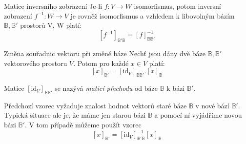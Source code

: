 \begin{vetaN}{Matice inversního zobrazení}
Je-li $f: V \rightarrow W$ isomorfismus, potom inversní zobrazení $f^{-1}: W \rightarrow V$ je rovněž isomorfismus a vzhledem k libovolným bázím $\mathbb{B}, \mathbb{B}'$ prostorů V, W platí:
$$[f^{-1}]_{\mathbb{B}' \mathbb{B}} = [f]^{-1}_{\mathbb{B} \mathbb{B}'}$$
\end{vetaN}

\begin{vetaN}{Změna souřadnic vektoru při změně báze}
Nechť jsou dány dvě báze $\mathbb{B}, \mathbb{B}'$ vektorového prostoru $V$. Potom pro každé $x \in V$ platí:
$$[x]_{\mathbb{B}'} = [\mathrm{id}_V]_{\mathbb{B} \mathbb{B}'}.[x]_{\mathbb{B}}$$

Matice $[\mathrm{id}_V]_{\mathbb{B} \mathbb{B}'}$ se nazývá \emph{maticí přechodu} od báze $\mathbb{B}$ k bázi $\mathbb{B}'$.
\end{vetaN}

\begin{poznamka}
Předchozí vzorec vyžaduje znalost hodnot vektorů staré báze $\mathbb{B}$ v nové bází $\mathbb{B}'$. Typická situace ale je, že máme jen starou bázi $\mathbb{B}$ a pomocí ní vyjádříme novou bázi $\mathbb{B}'$. V tom případě můžeme použít vzorec
$$[x]_{\mathbb{B}'} = [\mathrm{id}_V]^{-1}_{\mathbb{B}' \mathbb{B}} [x]_{\mathbb{B}}$$
\end{poznamka}
